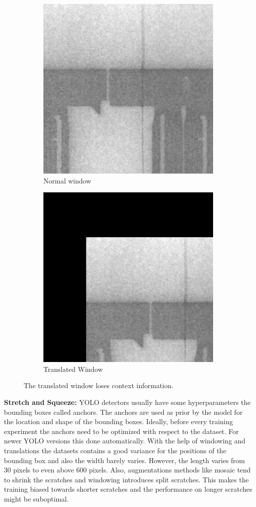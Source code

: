 \begin{figure}[!h]
\centering
\begin{subfigure}{.5\textwidth}
  \centering
  \includegraphics[width=.4\linewidth]{images/implementation/augmentations/window_no_translation}
  \caption{Normal window}
\end{subfigure}%
\begin{subfigure}{.5\textwidth}
  \centering
  \includegraphics[width=.4\linewidth]{images/implementation/augmentations/window_translation}
  \caption{Translated Window}
\end{subfigure}
\caption{The translated window loses context information.}
\label{impl:translation}
\end{figure}



\textbf{Stretch and Squeeze:}
YOLO detectors usually have some hyperparameters the bounding boxes called anchors. The anchors are used as prior by the model for the location and shape of the bounding boxes. Ideally, before every training experiment the anchors need to be optimized with respect to the dataset. For newer YOLO versions this done automatically. With the help of windowing and translations the datasets contains a good variance for the positions of the bounding box and also the width barely varies. However, the length varies from 30 pixels to even above 600 pixels. Also, augmentations methods like mosaic tend to shrink the scratches and windowing introduces split scratches. This makes the training biased towards shorter scratches and the performance on longer scratches might be suboptimal. \\


